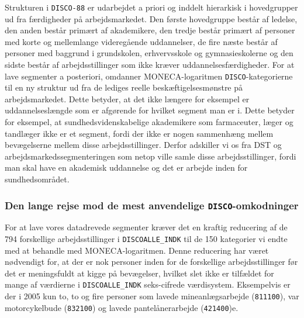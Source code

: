 Strukturen i \texttt{DISCO-88} er udarbejdet a priori og inddelt hierarkisk i hovedgrupper ud fra færdigheder på arbejdsmarkedet. Den første hovedgruppe består af ledelse, den anden består  primært af akademikere, den tredje består primært af personer med korte og mellemlange videregående uddannelser, de fire næste består af personer med baggrund i grundskolen, erhvervsskole og gymnasieskolerne og den sidste består af arbejdsstillinger som ikke kræver uddannelsesfærdigheder. For at lave segmenter a posteriori, omdanner MONECA-logaritmen \texttt{DISCO}-kategorierne til en ny struktur ud fra de lediges reelle beskæftigelsesmønstre på arbejdsmarkedet. Dette betyder, at det ikke længere for eksempel er uddannelseslængde som er afgørende for hvilket segment man er i. Dette betyder for eksempel, at sundhedsvidenskabelige akademikere som farmaceuter, læger og tandlæger ikke er et segment, fordi der ikke er nogen sammenhæng mellem bevægelserne mellem disse arbejdsstillinger. Derfor adskiller vi os fra DST og arbejdsmarkedssegmenteringen som netop ville samle disse arbejdsstillinger, fordi man skal have en akademisk uddannelse og det er arbejde inden for sundhedsområdet.



\subsubsection{Den lange rejse mod de mest anvendelige \texttt{DISCO}-omkodninger} \label{disco_omkodninger}

For at lave vores datadrevede segmenter kræver det en kraftig reducering af de 794 forskellige arbejdsstillinger i \texttt{DISCOALLE\_INDK} til de 150 kategorier vi endte med at behandle med MONECA-logaritmen. Denne reducering har været nødvendigt for, at der er nok personer inden for de forskellige arbejdsstillinger før det er meningsfuldt at kigge på bevægelser, hvilket slet ikke er tilfældet for mange af værdierne i \texttt{DISCOALLE\_INDK} seks-cifrede værdisystem. Eksempelvis er der i 2005 kun to, to og fire personer som lavede mineanlægsarbejde (\texttt{811100}), var motorcykelbude (\texttt{832100}) og lavede pantelånerarbejde (\texttt{421400})e.

